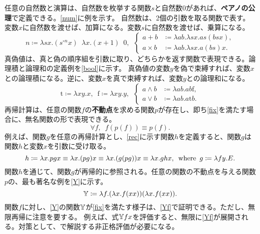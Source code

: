 \documentclass[10pt,a4paper]{book}
\begin{document}
任意の自然数と演算は、自然数を枚挙する関数$s$と自然数$0$があれば、\textbf{ペアノの公理}で定義できる。\eqref{num}に例を示す。
自然数は、2個の引数を取る関数で表す。変数$x$に自然数を渡せば、加算になる。変数$s$に自然数を渡せば、乗算になる。
%
\begin{equation}
\label{eq:num}
n \coloneqq \lambda sx.(s^{\circ n}x) \enspace \lambda x.(x+1) \enspace 0,
\enspace
\left\{
\begin{aligned}
a + b &\coloneqq \lambda ab.\lambda sx.as(bsx),\\
a \times b &\coloneqq \lambda ab.\lambda sx.a(bs)x.
\end{aligned}
\right.
\end{equation}
%
真偽値は、真と偽の順序組を引数に取り、どちらかを返す関数で表現できる。論理積と論理和の定義例を\eqref{bool}に示す。
真偽値の変数$y$を偽で束縛すれば、変数$x$との論理積になる。逆に、変数$x$を真で束縛すれば、変数$y$との論理和になる。
%
\begin{equation}
\label{eq:bool}
\mathrm{t} \coloneqq \lambda xy.x, \enspace
\mathrm{f} \coloneqq \lambda xy.y, \enspace
\left\{
\begin{aligned}
a \land b &\coloneqq \lambda ab.ab\mathrm{f},\\
a \lor  b &\coloneqq \lambda ab.a\mathrm{t}b.
\end{aligned}
\right.
\end{equation}
%
再帰計算は、任意の関数$f$の\textbf{不動点}を求める関数$p$が存在し、即ち\eqref{fix}を満たす場合に、無名関数の形で表現できる。
%
\begin{equation}
\label{eq:fix}
\forall f, \enspace f(p(f)) \equiv p(f).
\end{equation}
%
例えば、関数$g$を任意の再帰計算とし、\eqref{rec}に示す関数$h$を定義すると、関数$g$は関数$h$と変数$x$を引数に受け取る。
%
\begin{equation}
\label{eq:rec}
h \coloneqq \lambda x.pgx
\equiv \lambda x.(pg)x
\equiv \lambda x.(g (pg)) x
\equiv \lambda x.ghx
, \enspace\mathrm{where}\enspace g \coloneqq \lambda fy.E.
\end{equation}
%
関数$h$を通じて、関数$g$が再帰的に参照される。任意の関数の不動点を与える関数$p$の、最も著名な例を\eqref{Y}に示す。
%
\begin{equation}
\label{eq:Y}
\mathbb{Y}{} \coloneqq \lambda f.(\lambda x.f(xx))(\lambda x.f(xx)).
\end{equation}
%
関数$f$に対し、\eqref{Y}の関数$\mathbb{Y}$が\eqref{fix}を満たす様子は、\eqref{Yf}で証明できる。ただし、無限再帰に注意を要する。
例えば、式$\mathbb{Y}{}fx$を評価すると、無限に\eqref{Yf}が展開される。対策として、で解説する非正格評価が必要になる。
\end{document}
